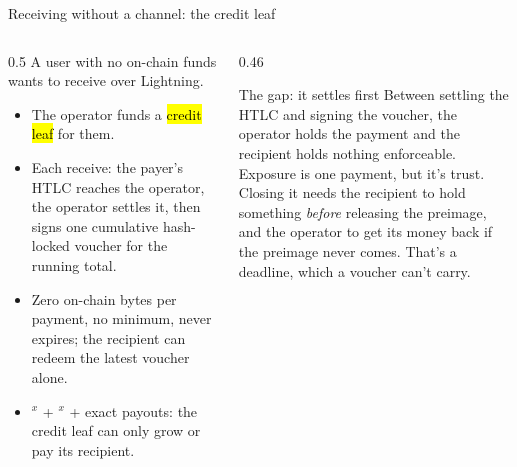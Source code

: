 \documentclass[aspectratio=169,10pt]{beamer}
\begin{document}
\begin{frame}{Receiving without a channel: the credit leaf}
  \begin{columns}[T]
    \begin{column}{0.5\textwidth}
      A user with no on-chain funds wants to receive over Lightning.
      \begin{itemize}
        \item The operator funds a \hl{credit leaf} for them.
        \item Each receive: the payer's HTLC reaches the operator, the operator settles it, then signs one cumulative hash-locked voucher for the running total.
        \item Zero on-chain bytes per payment, no minimum, never expires; the recipient can redeem the latest voucher alone.
        \item {}$^x$ + $^x$ + exact payouts: the credit leaf can only grow or pay its recipient.
      \end{itemize}
    \end{column}
    \begin{column}{0.46\textwidth}
      \begin{block}{The gap: it settles first}
        Between settling the HTLC and signing the voucher, the operator holds the payment and the recipient holds nothing enforceable.\\[0.4em]
        Exposure is one payment, but it's trust.\\[0.4em]
        Closing it needs the recipient to hold something \emph{before} releasing the preimage, and the operator to get its money back if the preimage never comes. That's a deadline, which a voucher can't carry.
      \end{block}
    \end{column}
  \end{columns}
\end{frame}
\end{document}
